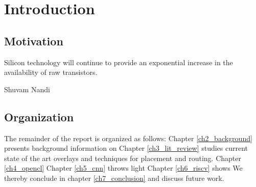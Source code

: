 \chapter{Introduction}
\label{ch1_introduction}
\section{Motivation}
Silicon technology will continue to provide an exponential increase in the availability of raw transistors. 

Shuvam Nandi



\section{Organization}
The remainder of the report is organized as follows: 
Chapter \ref{ch2_background} presents background information on
Chapter \ref{ch3_lit_review} studies current state of the art overlays and techniques for placement and routing.
Chapter \ref{ch4_opencl} 
Chapter \ref{ch5_cnn} throws light 
Chapter \ref{ch6_riscv} shows 
We thereby conclude in chapter \ref{ch7_conclusion} and discuss future work.
